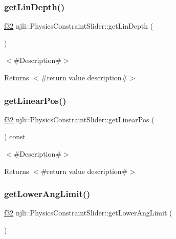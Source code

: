 \subsubsection{\texorpdfstring{get\+Lin\+Depth()}{getLinDepth()}}
{\footnotesize\ttfamily \mbox{\hyperlink{_util_8h_a5f6906312a689f27d70e9d086649d3fd}{f32}} njli\+::\+Physics\+Constraint\+Slider\+::get\+Lin\+Depth (\begin{DoxyParamCaption}{ }\end{DoxyParamCaption})}

$<$\#\+Description\#$>$

\begin{DoxyReturn}{Returns}
$<$\#return value description\#$>$ 
\end{DoxyReturn}
\mbox{\label{classnjli_1_1_physics_constraint_slider_a78c6ac55f5986dcfeeb43291019bd94b}} 
\subsubsection{\texorpdfstring{get\+Linear\+Pos()}{getLinearPos()}}
{\footnotesize\ttfamily \mbox{\hyperlink{_util_8h_a5f6906312a689f27d70e9d086649d3fd}{f32}} njli\+::\+Physics\+Constraint\+Slider\+::get\+Linear\+Pos (\begin{DoxyParamCaption}{ }\end{DoxyParamCaption}) const}

$<$\#\+Description\#$>$

\begin{DoxyReturn}{Returns}
$<$\#return value description\#$>$ 
\end{DoxyReturn}
\mbox{\label{classnjli_1_1_physics_constraint_slider_a236211fb9108e12d05d70996c77f9b98}} 
\subsubsection{\texorpdfstring{get\+Lower\+Ang\+Limit()}{getLowerAngLimit()}}
{\footnotesize\ttfamily \mbox{\hyperlink{_util_8h_a5f6906312a689f27d70e9d086649d3fd}{f32}} njli\+::\+Physics\+Constraint\+Slider\+::get\+Lower\+Ang\+Limit (\begin{DoxyParamCaption}{ }\end{DoxyParamCaption})}

